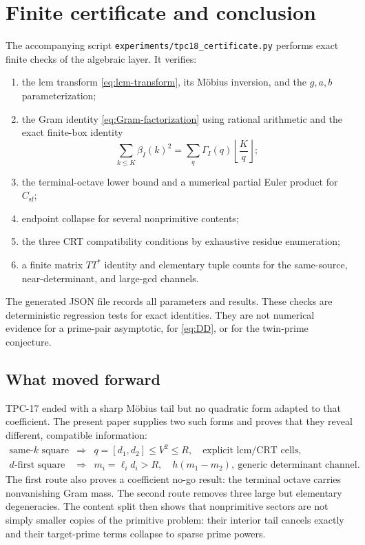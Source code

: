 \section{Finite certificate and conclusion}
\label{sec:computation}

The accompanying script
\texttt{experiments/tpc18\_certificate.py} performs exact finite checks
of the algebraic layer.  It verifies:

\begin{enumerate}
\item the lcm transform \eqref{eq:lcm-transform}, its M\"obius
inversion, and the $g,a,b$ parameterization;
\item the Gram identity \eqref{eq:Gram-factorization} using rational
arithmetic and the exact finite-box identity
\[
 \sum_{k\le K}\beta_I(k)^2
 =\sum_q\Gamma_I(q)\left\lfloor\frac Kq\right\rfloor;
\]
\item the terminal-octave lower bound and a numerical partial Euler
product for $C_{\mathrm{sf}}$;
\item endpoint collapse for several nonprimitive contents;
\item the three CRT compatibility conditions by exhaustive residue
enumeration;
\item a finite matrix $TT^*$ identity and elementary tuple counts for
the same-source, near-determinant, and large-gcd channels.
\end{enumerate}

The generated JSON file records all parameters and results.  These
checks are deterministic regression tests for exact identities.  They
are not numerical evidence for a prime-pair asymptotic, for
\eqref{eq:DD}, or for the twin-prime conjecture.

\subsection{What moved forward}

TPC-17 ended with a sharp M\"obius tail but no quadratic form adapted
to that coefficient.  The present paper supplies two such forms and
proves that they reveal different, compatible information:
\begin{equation}
 \begin{array}{ccl}
 \text{same-$k$ square}
 &\Longrightarrow& q=[d_1,d_2]\le V^2\le R,
 \quad\text{explicit lcm/CRT cells},\\[0.3em]
 \text{$d$-first square}
 &\Longrightarrow& m_i=\ell_i d_i>R,
 \quad h(m_1-m_2),\ \text{generic determinant channel}.
 \end{array}
 \label{eq:two-quadraticizations-summary}
\end{equation}
The first route also proves a coefficient no-go result: the terminal
octave carries nonvanishing Gram mass.  The second route removes three
large but elementary degeneracies.  The content split then shows that
nonprimitive sectors are not simply smaller copies of the primitive
problem: their interior tail cancels exactly and their target-prime
terms collapse to sparse prime powers.

